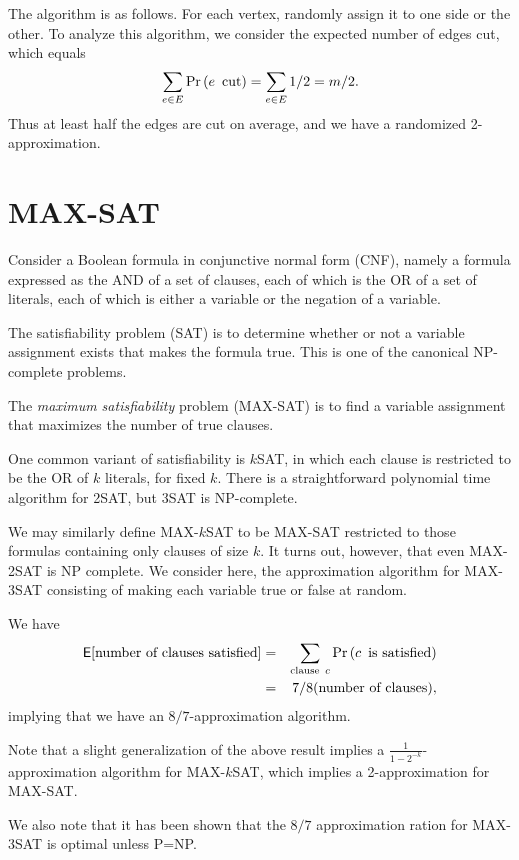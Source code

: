\documentclass{article}
\renewcommand{\Pr}[1]{\textrm{\textup{Pr}}\left( #1 \right)}
\newcommand{\E}{\mbox{$\mathsf E$}}
\begin{document}
The algorithm is as follows.  For each vertex, randomly assign it to one side or the other.  To analyze this algorithm, we consider the expected number of edges cut, which equals
$$\sum_{e\in E} \Pr{e \textrm{\enspace cut}}=\sum_{e\in E} 1/2=m/2.$$
Thus at least half the edges are cut on average, and we have a randomized 2-approximation.

\section{MAX-SAT}

Consider a Boolean formula in conjunctive normal form (CNF), namely a formula expressed as the AND of a set of clauses, each of which is the OR of a set of literals, each of which is either a variable or the negation of a variable.

The satisfiability problem (SAT) is to determine whether or not a variable assignment exists that makes the formula true.  This is one of the canonical NP-complete problems.

The \emph{maximum satisfiability} problem (MAX-SAT) is to find a variable assignment that maximizes the number of true clauses.

One common variant of satisfiability is $k$SAT, in which each clause is restricted to be the OR of $k$ literals, for fixed $k$.  There is a straightforward polynomial time algorithm for 2SAT, but 3SAT is NP-complete.

We may similarly define MAX-$k$SAT to be MAX-SAT restricted to those formulas containing only clauses of size $k$.  It turns out, however, that even MAX-2SAT is NP complete.  We consider here, the approximation algorithm for MAX-3SAT consisting of making each variable true or false at random.

We have 
\begin{align}
\E[\textrm{number of clauses satisfied}]&=&\sum_{\textrm{clause\enspace} c}\Pr{c\textrm{\enspace is satisfied}}\\
&=&7/8 (\textrm{number of clauses}),
\end{align}
implying that we have an $8/7$-approximation algorithm.

Note that a slight generalization of the above result implies a $\frac{1}{1-2^{-k}}$-approximation algorithm for MAX-$k$SAT, which implies a 2-approximation for MAX-SAT.

We also note that it has been shown that the $8/7$ approximation ration for MAX-3SAT is optimal unless P=NP.
\end{document}
